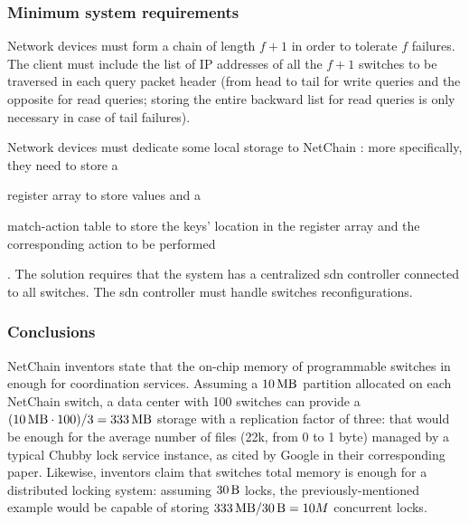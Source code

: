 \subsubsection{Minimum system requirements}
Network devices must form a chain of length $f + 1$ in order to tolerate $f$ failures. The client must include the list of IP addresses of all the $f + 1$ switches to be traversed in each query packet header (from head to tail for write queries and the opposite
for read queries; storing the entire backward list for read queries is only necessary in case of tail failures).\par
Network devices must dedicate some local storage to NetChain \cite{netchain}: more specifically, they need to store a
\begin{mylist}
    \item register array to store values and a
    \item match-action table to store the keys' location in the register array and the corresponding action to be performed
\end{mylist}.
The solution requires that the system has a centralized \gls{sdn} controller connected to all switches.
The \gls{sdn} controller must handle switches reconfigurations.

\subsubsection{Conclusions}
NetChain \cite{netchain} inventors state that the on-chip memory of programmable switches in enough for coordination services.
Assuming a $\SI{10}{\mega\byte}$ partition allocated on each NetChain \cite{netchain} switch, a data center with 100 switches can provide a $(\SI{10}{\mega\byte} \cdot 100) / 3 = \SI{333}{\mega\byte}$ storage with a replication factor of three: that would be enough for the average number of files (22k, from 0 to 1 byte) managed by a typical Chubby \cite{chubby} lock service instance, as cited by Google in their corresponding paper.
Likewise, inventors claim that switches total memory is enough for a distributed locking system: assuming $\SI{30}{\byte}$ locks, the previously-mentioned example would be capable of storing $\SI{333}{\mega\byte} / \SI{30}{\byte} = 10M$ concurrent locks.